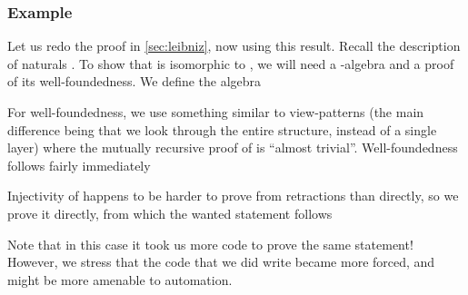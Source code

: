 \subsubsection{Example}
Let us redo the proof in \autoref{sec:leibniz}, now using this result. Recall the description of naturals . To show that  is isomorphic to , we will need a -algebra and a proof of its well-foundedness. We define the algebra

For well-foundedness, we use something similar to view-patterns %
(the main difference being that we look through the entire structure, instead of a single layer)
where the mutually recursive proof of  is ``almost trivial''. Well-foundedness follows fairly immediately

Injectivity of  happens to be harder to prove from retractions than directly, so we prove it directly, from which the wanted statement follows

Note that in this case it took us more code to prove the same statement! However, we stress that the code that we did write became more forced, and might be more amenable to automation.

